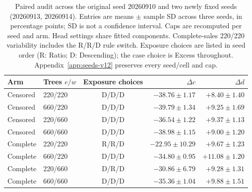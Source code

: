 \begin{table}[t]\centering\small
\caption{Paired audit across the original seed 20260910 and two newly fixed seeds (20260913, 20260914). Entries are means $\pm$ sample SD across three seeds, in percentage points; SD is not a confidence interval. Caps are recomputed per seed and arm. Head settings share fitted components. Complete-sales 220/220 variability includes the R/R/D rule switch. Exposure choices are listed in seed order (R: Ratio; D: Descending); the case choice is Excess throughout. Appendix~\ref{app:seeds-v12} preserves every seed/cell and cap.}\label{tab:matched-history}
\begin{tabular}{llcrr}\toprule
Arm & Trees $e/w$ & Exposure choices & $\Delta c$ & $\Delta d$\\\midrule
Censored & 220/220 & D/D/D & $-38.76\pm1.17$ & $+8.40\pm1.40$ \\
Censored & 660/220 & D/D/D & $-39.79\pm1.34$ & $+9.25\pm1.69$ \\
Censored & 220/660 & D/D/D & $-36.54\pm1.22$ & $+9.37\pm1.13$ \\
Censored & 660/660 & D/D/D & $-38.98\pm1.15$ & $+9.00\pm1.20$ \\
Complete & 220/220 & R/R/D & $-22.95\pm10.29$ & $+9.67\pm1.23$ \\
Complete & 660/220 & D/D/D & $-34.80\pm0.95$ & $+11.08\pm1.20$ \\
Complete & 220/660 & D/R/D & $-30.86\pm6.79$ & $+9.28\pm1.31$ \\
Complete & 660/660 & D/D/D & $-35.36\pm1.04$ & $+9.88\pm1.51$ \\
\bottomrule\end{tabular}\end{table}
